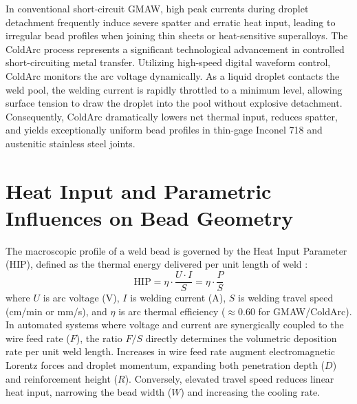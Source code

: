 \documentclass[12pt,a4paper,oneside]{report}
\begin{document}
In conventional short-circuit GMAW, high peak currents during droplet detachment frequently induce severe spatter and erratic heat input, leading to irregular bead profiles when joining thin sheets or heat-sensitive superalloys. The ColdArc process represents a significant technological advancement in controlled short-circuiting metal transfer. Utilizing high-speed digital waveform control, ColdArc monitors the arc voltage dynamically. As a liquid droplet contacts the weld pool, the welding current is rapidly throttled to a minimum level, allowing surface tension to draw the droplet into the pool without explosive detachment. Consequently, ColdArc dramatically lowers net thermal input, reduces spatter, and yields exceptionally uniform bead profiles in thin-gage Inconel 718 and austenitic stainless steel joints.

\section{Heat Input and Parametric Influences on Bead Geometry}
The macroscopic profile of a weld bead is governed by the Heat Input Parameter (HIP), defined as the thermal energy delivered per unit length of weld \cite{kah2013}:
\begin{equation}\label{eq:hip}
    \text{HIP} = \eta \cdot \frac{U \cdot I}{S} = \eta \cdot \frac{P}{S}
\end{equation}
where $U$ is arc voltage (V), $I$ is welding current (A), $S$ is welding travel speed (cm/min or mm/s), and $\eta$ is arc thermal efficiency ($\approx 0.60$ for GMAW/ColdArc). In automated systems where voltage and current are synergically coupled to the wire feed rate ($F$), the ratio $F/S$ directly determines the volumetric deposition rate per unit weld length. Increases in wire feed rate augment electromagnetic Lorentz forces and droplet momentum, expanding both penetration depth ($D$) and reinforcement height ($R$). Conversely, elevated travel speed reduces linear heat input, narrowing the bead width ($W$) and increasing the cooling rate.
\end{document}
